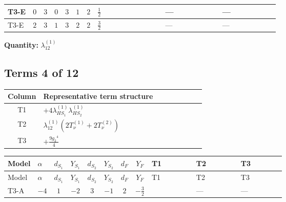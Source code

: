 \documentclass[8pt]{article}
\begin{document}
\begin{landscape}
\begin{longtable}{@{}llcccccc >{\raggedright\arraybackslash}p{0.21\linewidth} >{\raggedright\arraybackslash}p{0.21\linewidth} >{\raggedright\arraybackslash}p{0.21\linewidth}@{}}
\midrule
T3-E & $0$ & $3$ & $0$ & $3$ & $1$ & $2$ & $\frac{1}{2}$ & \scriptsize\adjustbox{max width=\linewidth}{$\begin{gathered} +4 {\lambda_{12}^{(1)}}^2\end{gathered}$} & --- & --- \\
\midrule
T3-E & $2$ & $3$ & $1$ & $3$ & $2$ & $2$ & $\frac{3}{2}$ & \scriptsize\adjustbox{max width=\linewidth}{$\begin{gathered} +4 {\lambda_{12}^{(1)}}^2\end{gathered}$} & --- & --- \\
\midrule
\bottomrule
\end{longtable}
\clearpage
\noindent\textbf{Quantity: }$\lambda_{12}^{(1)}$\par\smallskip
\subsection*{Terms 4 of 12}
\begin{center}
\begin{tabular}{@{}c >{\raggedright\arraybackslash}p{0.82\linewidth}@{}}
\toprule
Column & Representative term structure \\
\midrule
T1 & \(\displaystyle +4 {\lambda_{HS_1}^{(1)}} {\lambda_{HS_2}^{(1)}}\) \\
\midrule
T2 & \(\displaystyle {\lambda_{12}^{(1)}} (2 T_{\nu}^{(1)}+2 T_{\nu}^{(2)})\) \\
\midrule
T3 & \(\displaystyle +\frac{9 {g_2}^4}{4}\) \\
\midrule
\bottomrule
\end{tabular}
\end{center}
\smallskip
\tiny
\begin{longtable}{@{}llcccccc >{\raggedright\arraybackslash}p{0.21\linewidth} >{\raggedright\arraybackslash}p{0.21\linewidth} >{\raggedright\arraybackslash}p{0.21\linewidth}@{}}
\toprule
Model & $\alpha$ & $d_{S_1}$ & $Y_{S_1}$ & $d_{S_2}$ & $Y_{S_2}$ & $d_F$ & $Y_F$ & T1 & T2 & T3 \\
\midrule
\endfirsthead
\toprule
Model & $\alpha$ & $d_{S_1}$ & $Y_{S_1}$ & $d_{S_2}$ & $Y_{S_2}$ & $d_F$ & $Y_F$ & T1 & T2 & T3 \\
\midrule
\endhead
T3-A & $-4$ & $1$ & $-2$ & $3$ & $-1$ & $2$ & $-\frac{3}{2}$ & \scriptsize\adjustbox{max width=\linewidth}{$\begin{gathered} +4 {\lambda_{HS_1}^{(1)}} {\lambda_{HS_2}^{(1)}}\end{gathered}$} & --- & --- \\

\end{longtable}
\end{landscape}
\end{document}
